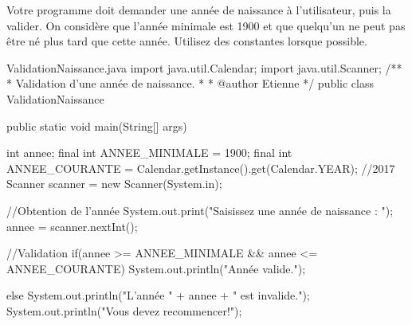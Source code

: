 \documentclass[12pt]{article}
\begin{document}
Votre programme doit demander une année de naissance à l'utilisateur, puis la valider. On considère que l'année minimale est 1900 et que quelqu'un ne peut pas être né plus tard que cette année. Utilisez des constantes lorsque possible.

\begin{MyTCB}{ValidationNaissance.java}
import java.util.Calendar;
import java.util.Scanner;
/**
 * Validation d'une année de naissance.
 * 
 * @author Etienne
 */
public class ValidationNaissance {

	public static void main(String[] args) {
		
		int annee;
		final int ANNEE_MINIMALE = 1900;
		final int ANNEE_COURANTE = Calendar.getInstance().get(Calendar.YEAR); //2017
		Scanner scanner = new Scanner(System.in);
		
		
		//Obtention de l'année
		System.out.print("Saisissez une année de naissance : ");
		annee = scanner.nextInt();
		
		
		//Validation
		if(annee >= ANNEE_MINIMALE && annee <= ANNEE_COURANTE)
			System.out.println("Année valide.");
		
		else {
			System.out.println("L'année " + annee + " est invalide.");
			System.out.println("Vous devez recommencer!");
		}

	}

}
\end{MyTCB}
\end{document}
